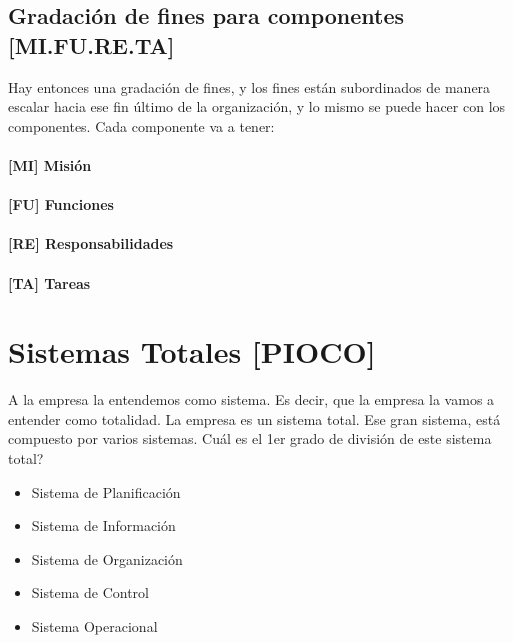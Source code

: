 \hypertarget{gradaciuxf3n-de-fines-para-componentes-mi.fu.re.ta}{%
\subsection{Gradación de fines para componentes
{[}MI.FU.RE.TA{]}}\label{gradaciuxf3n-de-fines-para-componentes-mi.fu.re.ta}}

Hay entonces una gradación de fines, y los fines están subordinados de
manera escalar hacia ese fin último de la organización, y lo mismo se
puede hacer con los componentes. Cada componente va a tener: 
\paragraph{{[}MI{]} Misión}
\paragraph{{[}FU{]} Funciones}
\paragraph{{[}RE{]} Responsabilidades}
\paragraph{{[}TA{]} Tareas}


\hypertarget{sistemas-totales-pioco}{%
\section{Sistemas Totales {[}PIOCO{]}}\label{sistemas-totales-pioco}}

A la empresa la entendemos como sistema. Es decir, que la empresa la
vamos a entender como totalidad. La empresa es un sistema total. Ese
gran sistema, está compuesto por varios sistemas. Cuál es el 1er grado
de división de este sistema total?

\begin{itemize}
  \setlength\itemsep{-1em}
\item
  Sistema de Planificación
\item
  Sistema de Información
\item
  Sistema de Organización
\item
  Sistema de Control
\item
  Sistema Operacional
\end{itemize}

